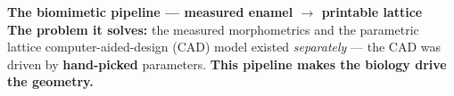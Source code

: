 \documentclass[10pt]{extarticle}
\begin{document}
\begin{tcolorbox}[colback=hdrblue, colframe=hdrblue, boxrule=0pt, sharp corners,
                  left=8pt, right=8pt, top=5pt, bottom=5pt]
{\color{white}\Large\bfseries The biomimetic pipeline --- measured enamel $\rightarrow$ printable lattice}\\[2pt]
{\color{hdrsky}\footnotesize
\textbf{The problem it solves:} the measured morphometrics and the parametric lattice computer-aided-design (CAD) model existed \emph{separately} --- the CAD was driven by \textbf{hand-picked} parameters. \textbf{This pipeline makes the biology drive the geometry.}}
\end{tcolorbox}

\vspace{3pt}
\end{document}
